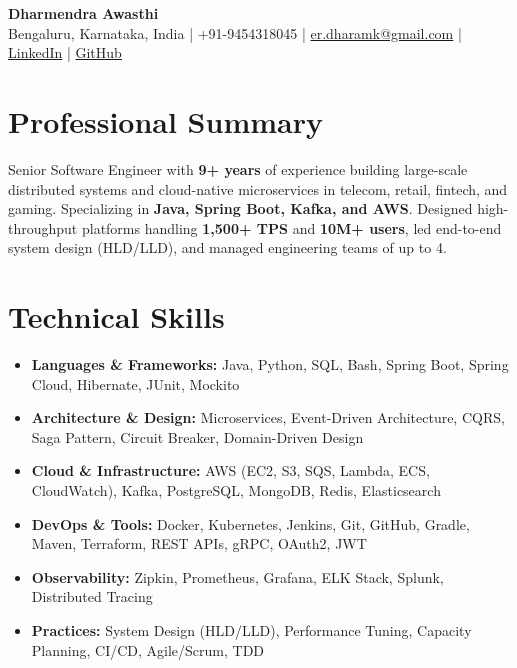 \documentclass[10pt,a4paper]{article}
\begin{document}
\begin{center}
  {\Large \textbf{Dharmendra Awasthi}}\\[3pt]
  {\small Bengaluru, Karnataka, India \;|\; +91-9454318045 \;|\; \href{mailto:er.dharamk@gmail.com}{er.dharamk@gmail.com} \;|\;
    \href{https://www.linkedin.com/in/dharamcodes/}{LinkedIn} \;|\;
    \href{https://github.com/dharamcodes}{GitHub}}
\end{center}

\section{Professional Summary}
\vspace{0.5pt}
Senior Software Engineer with \textbf{9+ years} of experience building large-scale distributed systems and cloud-native microservices in telecom, retail, fintech, and gaming. Specializing in \textbf{Java, Spring Boot, Kafka, and AWS}. Designed high-throughput platforms handling \textbf{1,500+ TPS} and \textbf{10M+ users}, led end-to-end system design (HLD/LLD), and managed engineering teams of up to 4.

\vspace{1pt}
\section{Technical Skills}
\vspace{0.5pt}
\begin{itemize}[leftmargin=0pt,nosep,itemsep=0.5pt,label={}]
  \item \textbf{Languages \& Frameworks:} Java, Python, SQL, Bash, Spring Boot, Spring Cloud, Hibernate, JUnit, Mockito
  \item \textbf{Architecture \& Design:} Microservices, Event-Driven Architecture, CQRS, Saga Pattern, Circuit Breaker, Domain-Driven Design
  \item \textbf{Cloud \& Infrastructure:} AWS (EC2, S3, SQS, Lambda, ECS, CloudWatch), Kafka, PostgreSQL, MongoDB, Redis, Elasticsearch
  \item \textbf{DevOps \& Tools:} Docker, Kubernetes, Jenkins, Git, GitHub, Gradle, Maven, Terraform, REST APIs, gRPC, OAuth2, JWT
  \item \textbf{Observability:} Zipkin, Prometheus, Grafana, ELK Stack, Splunk, Distributed Tracing
  \item \textbf{Practices:} System Design (HLD/LLD), Performance Tuning, Capacity Planning, CI/CD, Agile/Scrum, TDD
\end{itemize}
\end{document}

